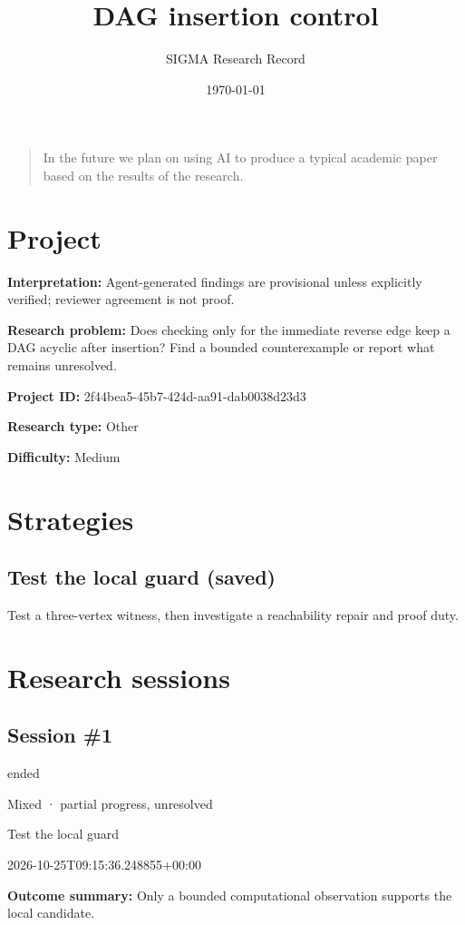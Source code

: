 \documentclass[11pt]{article}
\title{DAG insertion control}
\author{SIGMA Research Record}
\date{\today}
\begin{document}
\maketitle
\begin{quote}\small In the future we plan on using AI to produce a typical academic paper based on the results of the research.\end{quote}
\section{Project}
\textbf{Interpretation:} Agent-generated findings are provisional unless explicitly verified; reviewer agreement is not proof.\par
\textbf{Research problem:} Does checking only for the immediate reverse edge keep a DAG acyclic after insertion? Find a bounded counterexample or report what remains unresolved.\par
\textbf{Project ID:} 2f44bea5-45b7-424d-aa91-dab0038d23d3\par
\textbf{Research type:} Other\par
\textbf{Difficulty:} Medium\par
\section{Strategies}
\subsection{Test the local guard (saved)}
Test a three-vertex witness, then investigate a reachability repair and proof duty.\par
\section{Research sessions}
\subsection{Session \#1}
\begin{description}[style=nextline,font=\normalfont\bfseries,leftmargin=0pt,labelsep=0pt]
\item[Execution status] ended
\item[Outcome] Mixed · partial progress, unresolved
\item[Strategy] Test the local guard
\item[Started] 2026-10-25T09:15:36.248855+00:00
\end{description}
\textbf{Outcome summary:} Only a bounded computational observation supports the local candidate.\par
\end{document}
